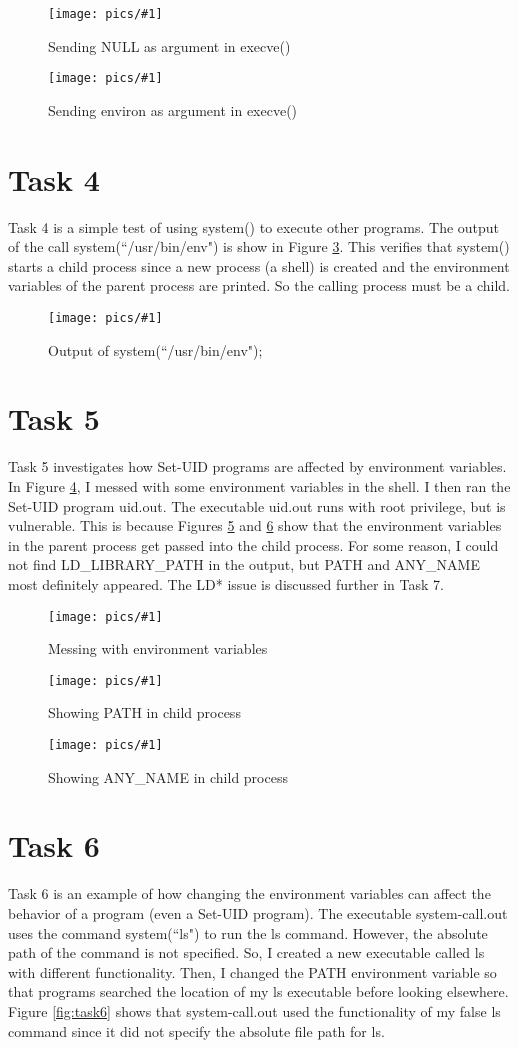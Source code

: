 \documentclass[11pt]{article}
\newcommand{\fig}[2]{ 
\begin{figure}[h]
	\centering
	\caption{#2}
	\texttt{[image: pics/\#1]}
	\label{fig:#1}
\end{figure} 
}
\begin{document}
\fig{task3.1}{Sending NULL as argument in execve()}
\fig{task3.2}{Sending environ as argument in execve()}

\newpage

\section*{Task 4}

Task 4 is a simple test of using system() to execute other programs. The output of the call system(``/usr/bin/env") is show in Figure \ref{fig:task4}.
This verifies that system() starts a child process since a new process (a shell) is created and the environment variables of the parent process are printed. 
So the calling process must be a child.

\fig{task4}{Output of system(``/usr/bin/env");}

\newpage

\section*{Task 5}

Task 5 investigates how Set-UID programs are affected by environment variables.
In Figure \ref{fig:task5.1}, I messed with some environment variables in the shell. I then ran the Set-UID program uid.out. 
The executable uid.out runs with root privilege, but is vulnerable.
This is because Figures \ref{fig:task5.2} and \ref{fig:task5.3} show that the environment variables in the parent process get passed into the child process.
For some reason, I could not find LD\_LIBRARY\_PATH in the output, but PATH and ANY\_NAME most definitely appeared. The LD* issue is discussed further in Task 7.

\fig{task5.1}{Messing with environment variables}
\fig{task5.2}{Showing PATH in child process}
\fig{task5.3}{Showing ANY\_NAME in child process}

\newpage

\section*{Task 6}

Task 6 is an example of how changing the environment variables can affect the behavior of a program (even a Set-UID program).
The executable system-call.out uses the command system(``ls") to run the ls command. 
However, the absolute path of the command is not specified. 
So, I created a new executable called ls with different functionality.
Then, I changed the PATH environment variable so that programs searched the location of my ls executable before looking elsewhere.
Figure \ref{fig:task6} shows that system-call.out used the functionality of my false ls command since it did not specify the absolute file path for ls.
\end{document}
